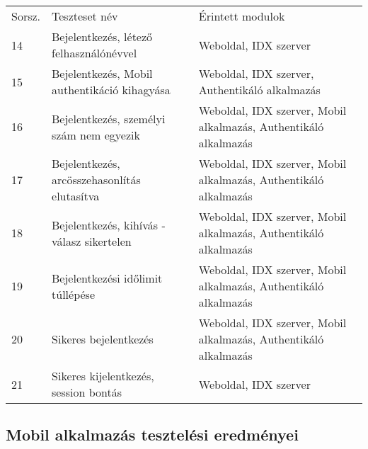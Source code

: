 \begin{tabular}{|p{1cm}|p{8cm} |p{4cm}|}
  \hline
\rowcolor{Title}
\multicolumn{3}{ |c| }{\color{white} Teszteset leírása} \\
  \hline
\rowcolor{Header}
Sorsz. & Teszteset név & Érintett modulok\tabularnewline
\hline 
  14  & Bejelentkezés, létező felhasználónévvel & Weboldal, IDX szerver\tabularnewline
  \hline
 15  & Bejelentkezés, Mobil authentikáció kihagyása & Weboldal, IDX szerver, Authentikáló alkalmazás \tabularnewline
  \hline
 16  & Bejelentkezés, személyi szám nem egyezik  & Weboldal, IDX szerver, Mobil alkalmazás, Authentikáló alkalmazás \tabularnewline
  \hline
 17  & Bejelentkezés, arcösszehasonlítás elutasítva  & Weboldal, IDX szerver, Mobil alkalmazás, Authentikáló alkalmazás \tabularnewline
  \hline
 18  & Bejelentkezés, kihívás - válasz sikertelen  & Weboldal, IDX szerver, Mobil alkalmazás, Authentikáló alkalmazás \tabularnewline
  \hline
 19  & Bejelentkezési időlimit túllépése  & Weboldal, IDX szerver, Mobil alkalmazás, Authentikáló alkalmazás \tabularnewline
  \hline
 20  &Sikeres bejelentkezés  & Weboldal, IDX szerver, Mobil alkalmazás, Authentikáló alkalmazás \tabularnewline
  \hline
 21  &Sikeres kijelentkezés, session bontás  & Weboldal, IDX szerver \tabularnewline
  \hline
\end{tabular}

\subsection{Mobil alkalmazás tesztelési eredményei}

